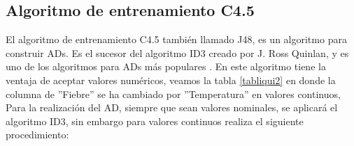 \documentclass[twoside,spanish,ESP,MSc]{plantillaLabUPV}
\theoremstyle{definition}
\begin{document}
\subsection{Algoritmo de entrenamiento C4.5}

El algoritmo de entrenamiento C4.5 también llamado J48, es un algoritmo para construir ADs. Es el sucesor del algoritmo ID3 creado por J. Ross Quinlan, y es uno de los algoritmos para ADs más populares \cite{c45salz}. 
En este algoritmo tiene la ventaja de aceptar valores numéricos, veamos la tabla \ref{tabliqui2} en donde la columna de ''Fiebre'' se ha cambiado por ''Temperatura'' en valores continuos, Para la realización del AD, siempre que sean valores nominales, se aplicará el algoritmo ID3, sin embargo para valores continuos realiza el siguiente procedimiento:
\end{document}
